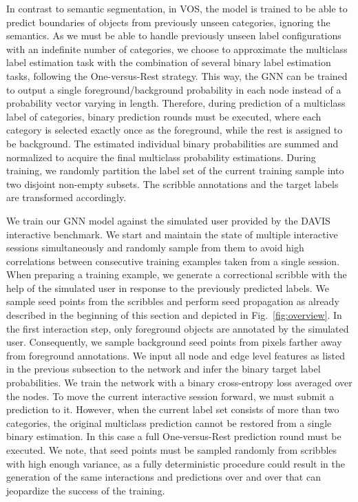 \documentclass[conference]{IEEEtran}
\begin{document}
In contrast to semantic segmentation, in VOS, the model is trained to be able to predict boundaries of objects from previously unseen categories, ignoring the semantics. As we must be able to handle previously unseen label configurations with an indefinite number of categories, we choose to approximate the multiclass label estimation task with the combination of several binary label estimation tasks, following the One-versus-Rest strategy. This way, the GNN can be trained to output a single foreground/background probability in each node instead of a probability vector varying in length. Therefore, during prediction of a multiclass label of  categories,  binary prediction rounds must be executed, where each category is selected exactly once as the foreground, while the rest is assigned to be background. The estimated individual binary probabilities are summed and normalized to acquire the final multiclass probability estimations. During training, we randomly partition the label set of the current training sample into two disjoint non-empty subsets. The scribble annotations and the target labels are transformed accordingly.

We train our GNN model against the simulated user provided by the DAVIS interactive benchmark. We start and maintain the state of multiple interactive sessions simultaneously and randomly sample from them to avoid high correlations between consecutive training examples taken from a single session. When preparing a training example, we generate a correctional scribble with the help of the simulated user in response to the previously predicted labels. We sample seed points from the scribbles and perform seed propagation as already described in the beginning of this section and depicted in Fig.~\ref{fig:overview}. In the first interaction step, only foreground objects are annotated by the simulated user. Consequently, we sample background seed points from pixels farther away from foreground annotations. We input all node and edge level features as listed in the previous subsection to the network and infer the binary target label probabilities. We train the network with a binary cross-entropy loss averaged over the nodes. To move the current interactive session forward, we must submit a prediction to it. However, when the current label set consists of more than two categories, the original multiclass prediction cannot be restored from a single binary estimation. In this case a full One-versus-Rest prediction round must be executed. We note, that seed points must be sampled randomly from scribbles with high enough variance, as a fully deterministic procedure could result in the generation of the same interactions and predictions over and over that can jeopardize the success of the training.
\end{document}
